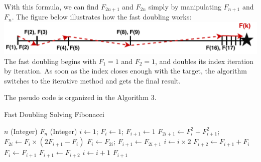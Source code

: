 \documentclass{article}
\begin{document}
With this formula, we can find $F_{2n+1}$ and $F_{2n}$ simply by manipulating $F_{n+1}$ and $F_{n}$. 
The figure below illustrates how the fast doubling works: \\
\includegraphics[width=\textwidth]{fast}
The fast doubling begins with $F_{1} = 1$ and $F_{2} = 1$, and doubles its index iteration by iteration.
As soon as the index closes enough with the target, the algorithm switches to the iterative method and gets the final result.

The pseudo code is organized in the Algorithm 3.
 
\begin{algorithm}
\caption{Fast Doubling Solving Fibonacci}
\begin{algorithmic}
    \Require $n$ (Integer)
    \Ensure $F_{n}$ (Integer)
      
    \EndIf
        \State $i \gets 1$; $F_{i} \gets 1$; $F_{i+1} \gets 1$
        \State $F_{2i+1} \gets F_{i}^2 + F_{i+1}^2$; $F_{2i} \gets F_{i} \times (2F_{i+1} - F_{i})$
        \State $F_{i} \gets F_{2i}$; $F_{i+1} \gets F_{2i+1}$
        \State $i \gets i \times 2$
    \Else
        \State $F_{i+2} \gets F_{i+1} + F_{i}$ 
        \State $F_{i} \gets F_{i+1}$
        \State $F_{i+1} \gets F_{i+2}$
        \State $i \gets i+1$
    \EndIf
    \EndWhile 
    \State \Return $F_{i+1}$
\end{algorithmic}
\end{algorithm}
\end{document}
